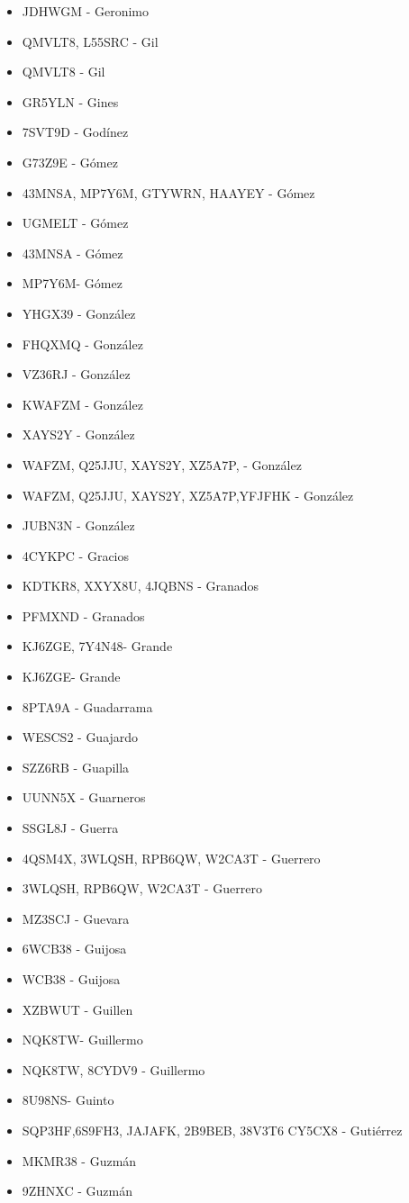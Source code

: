 \begin{itemize}[leftmargin=*,nosep]
\item JDHWGM - Geronimo
\item QMVLT8, L55SRC - Gil
\item QMVLT8  -  Gil
\item GR5YLN  -  Gines
\item 7SVT9D - Godínez
\item G73Z9E - Gómez
\item 43MNSA, MP7Y6M, GTYWRN, HAAYEY - Gómez
\item UGMELT - Gómez
\item 43MNSA -  Gómez
\item MP7Y6M- Gómez
\item YHGX39  -  González
\item FHQXMQ -  González
\item VZ36RJ  -  González
\item KWAFZM  -  González
\item XAYS2Y - González
\item WAFZM, Q25JJU, XAYS2Y, XZ5A7P, - González
\item WAFZM, Q25JJU, XAYS2Y, XZ5A7P,YFJFHK - González
\item JUBN3N - González
\item 4CYKPC - Gracios
\item KDTKR8, XXYX8U, 4JQBNS  -  Granados
\item PFMXND  -  Granados
\item KJ6ZGE, 7Y4N48- Grande
\item KJ6ZGE- Grande
\item 8PTA9A  -  Guadarrama
\item WESCS2 - Guajardo
\item SZZ6RB - Guapilla
\item UUNN5X - Guarneros
\item SSGL8J  -  Guerra
\item 4QSM4X, 3WLQSH, RPB6QW, W2CA3T - Guerrero
\item 3WLQSH, RPB6QW, W2CA3T  -  Guerrero
\item MZ3SCJ - Guevara
\item 6WCB38 - Guijosa
\item WCB38 - Guijosa
\item XZBWUT  -  Guillen
\item NQK8TW- Guillermo
\item NQK8TW, 8CYDV9 - Guillermo
\item 8U98NS- Guinto
\item SQP3HF,6S9FH3, JAJAFK, 2B9BEB, 38V3T6  CY5CX8 -  Gutiérrez
\item MKMR38 - Guzmán
\item 9ZHNXC - Guzmán
\end{itemize}

